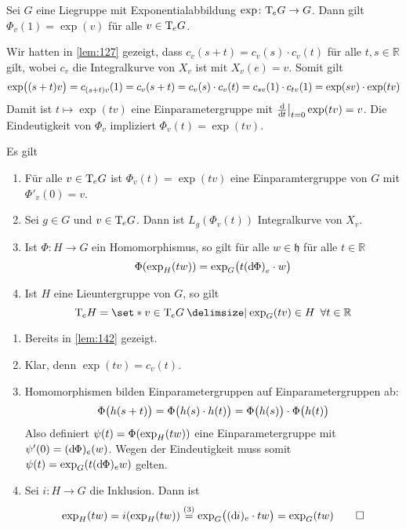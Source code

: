 \begin{lemma}[label=lem:142,{name=[Verträglichkeit mit \cref{lem:127}]}]
	Sei $G$ eine Liegruppe mit Exponentialabbildung $\exp \colon \Tmap_e G \to G$.
	Dann gilt $\Phi_v(1) = \exp(v)$ für alle $v \in \Tmap_e G$.
\end{lemma}
\begin{beweis}
	Wir hatten in \autoref{lem:127} gezeigt, dass $c_v(s +t) = c_v(s) \cdot c_v(t)$ für alle $t,s \in \mathbb{R}$ gilt, wobei $c_v$ die Integralkurve von $X_v$ ist mit $X_v(e)=v$.
	Somit gilt
	\[
		\exp \enbrace[\big]{(s+t) v} = c_{(s+t)v}(1) = c_v(s+t) = c_v(s) \cdot c_v(t) = c_{sv}(1) \cdot c_{tv}(1) = \exp(sv) \cdot \exp(tv)
	\]
	Damit ist $t \mapsto \exp(tv)$ eine Einparametergruppe mit $\diffd{}{t}\big|_{t=0} \exp(tv)=v$.
	Die Eindeutigkeit von $\Phi_v$ impliziert $\Phi_v(t)=\exp(tv)$.
\end{beweis}

\begin{lemma}[label=lem:143,{name=[Eigenschaften der Exponentialabbildung]}]
	Es gilt
	\begin{enumerate}[(1),itemsep=0pt]
		\item Für alle $v \in \Tmap_eG$ ist $\Phi_v(t)=\exp(tv)$ eine Einparamtergruppe von $G$ mit $\Phi'_v(0)=v$.
		\item Sei $g \in G$ und $v \in \Tmap_eG$.
		Dann ist $L_g(\Phi_v(t))$ Integralkurve von $X_v$.
		\item Ist $\Phi \colon H \to G$ ein Homomorphismus, so gilt für alle $w \in \mathfrak{h}$ für alle $t \in \mathbb{R}$
		\[
			\Phi \enbrace*{\exp_H(tw)} = \exp_G \enbrace[\big]{t \enbrace*{\mathd \Phi}_e \cdot w}
		\]
		\item Ist $H$ eine Lieuntergruppe von $G$, so gilt
		\[
			\Tmap_e H = \set*{v \in \Tmap_e G \given \exp_G(tv) \in H \enspace \forall t \in \mathbb{R}}
		\]
	\end{enumerate}
\end{lemma}
\begin{beweis}
	\begin{enumerate}[(1),itemsep=0pt]
		\item Bereits in \autoref{lem:142} gezeigt.
		\item Klar, denn $\exp(tv)=c_v(t)$.
		\item Homomorphismen bilden Einparametergruppen auf Einparametergruppen ab:
		\[
			\Phi \enbrace[\big]{h(s+t)} = \Phi\enbrace[\big]{h(s) \cdot h(t)} = \Phi \enbrace[\big]{h(s)} \cdot \Phi \enbrace[\big]{h(t)}
		\]
		Also definiert $\psi(t) = \Phi \enbrace*{\exp_H(tw)}$ eine Einparametergruppe mit $\psi'(0) = (\mathd \Phi)_e (w)$.
		Wegen der Eindeutigkeit muss somit $\psi(t) = \exp_G \enbrace*{t (\mathd \Phi)_e w}$ gelten.
		\item Sei $i \colon H \to G$ die Inklusion.
		Dann ist 
		\[
			\exp_H(tw) = i \enbrace*{\exp_H(tw)} \StackText{(3)}{=} \exp_G \enbrace[\big]{(\mathd i)_e \cdot tw} = \exp_G(tw)\qedhere
		\]
	\end{enumerate}
\end{beweis}

